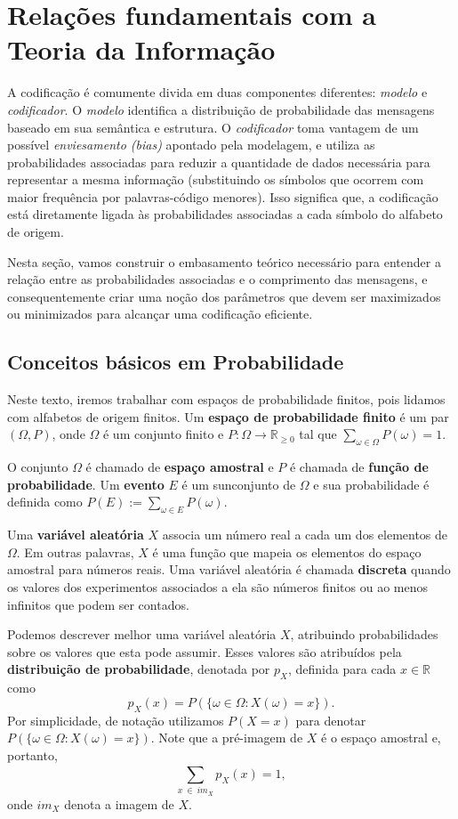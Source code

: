 \section{Relações fundamentais com a Teoria da Informação}
A codificação é comumente divida em duas componentes diferentes: \emph{modelo} e \emph{codificador}. 
O \emph{modelo} identifica a distribuição de probabilidade das mensagens baseado em sua semântica e estrutura. 
O \emph{codificador} toma vantagem de um possível \emph{enviesamento (bias)} apontado pela modelagem, e utiliza as probabilidades associadas para reduzir a quantidade de dados necessária para representar a mesma informação (substituindo os símbolos que ocorrem com maior frequência por palavras-código menores).
Isso significa que, a codificação está diretamente ligada às probabilidades associadas a cada símbolo do alfabeto de origem.

Nesta seção, vamos construir o embasamento teórico necessário para entender a relação entre as probabilidades associadas e o comprimento das mensagens, e consequentemente criar uma noção dos parâmetros que devem ser maximizados ou minimizados para alcançar uma codificação eficiente.

\subsection{Conceitos básicos em Probabilidade}
Neste texto, iremos trabalhar com espaços de probabilidade finitos,
pois lidamos com alfabetos de origem finitos. Um \textbf{espaço de
  probabilidade finito} é um par $(\Omega, P)$, onde $\Omega$ é um
conjunto finito e $P\colon \Omega \to \mathbb{R}_{\geq 0}$ tal que
$\sum_{\omega \in \Omega} P(\omega) = 1$.

O conjunto $\Omega$ é chamado de \textbf{espaço amostral} e $P$ é
chamada de \textbf{função de probabilidade}. Um \textbf{evento} $E$ é
um sunconjunto de $\Omega$ e sua probabilidade é definida como $P(E)
:= \sum_{\omega \in E} P(\omega)$.

Uma \textbf{variável aleatória} $X$ associa um número real a cada
um dos elementos de $\Omega$. Em outras palavras, $X$ é uma
função que mapeia os elementos do espaço amostral para números
reais. Uma variável aleatória é chamada \textbf{discreta} quando os
valores dos experimentos associados a ela são números finitos ou ao
menos infinitos que podem ser contados.

Podemos descrever melhor uma variável aleatória $X$, atribuindo
probabilidades sobre os valores que esta pode assumir. Esses valores
são atribuídos pela \textbf{distribuição de probabilidade}, denotada
por $p_X$, definida para cada $x\in\mathbb{R}$ como
\begin{equation} \label{eq:dist_prob_def}
p_X(x) = P(\{\omega\in \Omega: X(\omega) = x\}).
\end{equation}
Por simplicidade, de notação utilizamos $P(X=x)$ para denotar
$P(\{\omega\in \Omega: X(\omega) = x\})$. Note que a pré-imagem de $X$
é o espaço amostral e, portanto,
\begin{equation} \label{eq:dist_prob_sum}
\sum_{x ~\in ~im_X}^{}p_X(x) = 1,
\end{equation}
onde $im_X$ denota a imagem de $X$.

